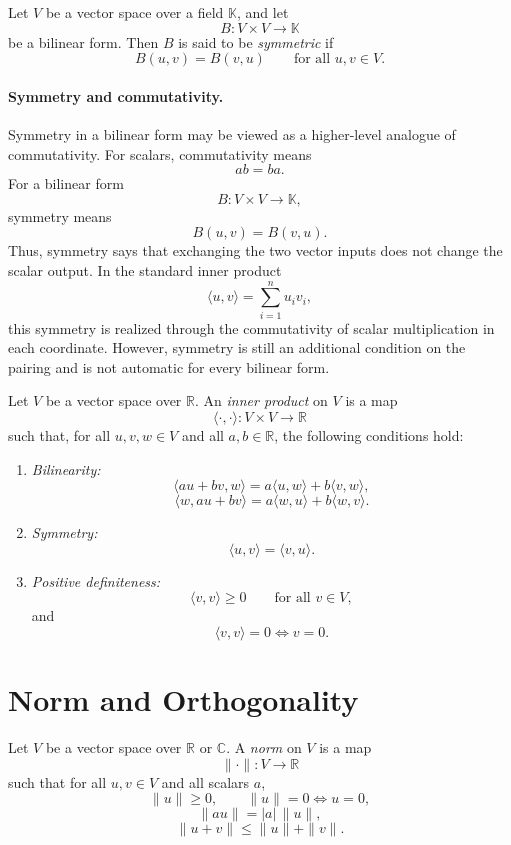 \documentclass{article}
\begin{document}
\begin{definition}
Let $V$ be a vector space over a field $\mathbb{K}$, and let
$$
B:V\times V\to\mathbb{K}
$$
be a bilinear form. Then $B$ is said to be \emph{symmetric} if
$$
B(u,v)=B(v,u)
\qquad
\text{for all }u,v\in V.
$$
\end{definition}

\paragraph{Symmetry and commutativity.}
Symmetry in a bilinear form may be viewed as a higher-level analogue of commutativity. For scalars, commutativity means
$$
ab=ba.
$$
For a bilinear form
$$
B:V\times V\to\mathbb{K},
$$
symmetry means
$$
B(u,v)=B(v,u).
$$
Thus, symmetry says that exchanging the two vector inputs does not change the scalar output. In the standard inner product
$$
\langle u,v\rangle=\sum_{i=1}^n u_i v_i,
$$
this symmetry is realized through the commutativity of scalar multiplication in each coordinate. However, symmetry is still an additional condition on the pairing and is not automatic for every bilinear form.

\begin{definition}
Let $V$ be a vector space over $\mathbb{R}$. An \emph{inner product} on $V$ is a map
$$
\langle\cdot,\cdot\rangle:V\times V\to\mathbb{R}
$$
such that, for all $u,v,w\in V$ and all $a,b\in\mathbb{R}$, the following conditions hold:
\begin{enumerate}
    \item \emph{Bilinearity:}
    $$
    \langle au+bv,w\rangle=a\langle u,w\rangle+b\langle v,w\rangle,
    $$
    $$
    \langle w,au+bv\rangle=a\langle w,u\rangle+b\langle w,v\rangle.
    $$
    \item \emph{Symmetry:}
    $$
    \langle u,v\rangle=\langle v,u\rangle.
    $$
    \item \emph{Positive definiteness:}
    $$
    \langle v,v\rangle\ge 0
    \qquad
    \text{for all }v\in V,
    $$
    and
    $$
    \langle v,v\rangle=0 \iff v=0.
    $$
\end{enumerate}
\end{definition}

\section{Norm and Orthogonality}

\begin{definition}[Norm]
Let $V$ be a vector space over $\mathbb{R}$ or $\mathbb{C}$. A \emph{norm} on $V$ is a map
$$
\|\cdot\|:V\to\mathbb{R}
$$
such that for all $u,v\in V$ and all scalars $a$,
$$
\|u\|\ge 0,
\qquad
\|u\|=0 \iff u=0,
$$
$$
\|au\|=|a|\,\|u\|,
$$
$$
\|u+v\|\le \|u\|+\|v\|.
$$
\end{definition}
\end{document}
